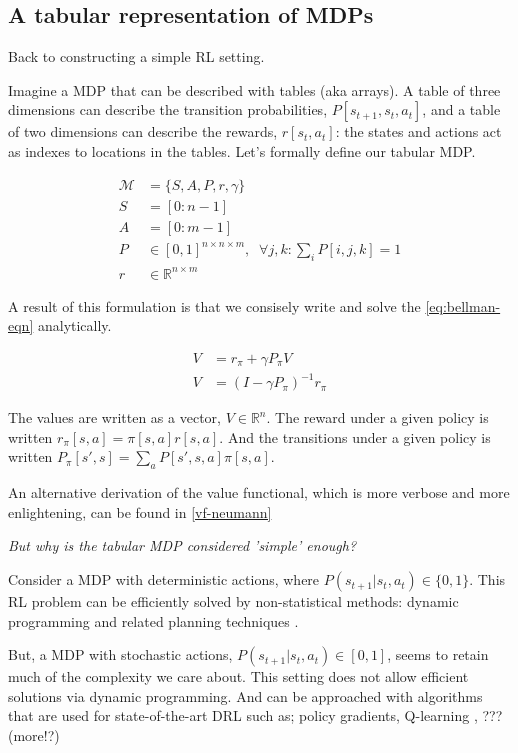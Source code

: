 \subsection{A tabular representation of MDPs}

Back to constructing a simple RL setting.

Imagine a MDP that can be described with tables (aka arrays). A table of
three dimensions can describe the transition probabilities, $P[s_{t+1}, s_t, a_t]$,
and a table of two dimensions can describe the rewards, $r[s_t, a_t]$: the
states and actions act as indexes to locations in the tables.
Let's formally define our tabular MDP.

\begin{align}
\mathcal M &= \{S, A, P, r, \gamma\}\; \tag{the MDP}\\
S &= [0:n-1] \tag{the state space}\\
A &= [0:m-1] \tag{the action space}\\
P &\in [0,1]^{n\times n \times m}, \;\;\forall j, k : \sum_i P[i, j, k] = 1 \tag{the transition fn}\\
r &\in \mathbb R^{n\times m} \tag{the reward fn}
\end{align}

A result of this formulation is that we consisely write and solve the \eqref{eq:bellman-eqn} analytically. \footnotemark[1]


\begin{align}
V &= r_{\pi} + \gamma P_{\pi} V \tag{tabular Bellman eqn}\\
V &= (I-\gamma P_{\pi})^{-1}r_{\pi}  \label{eq:value-functional}\tag{Value functional}
\end{align}

The values are written as a vector, $V \in \mathbb R^n$.
The reward under a given policy is written $r_{\pi}[s, a] = \pi[s, a] r[s, a]$.
And the transitions under a given policy is written $P_{\pi}[s', s] = \sum_a P[s', s, a]\pi[s, a]$.

An alternative derivation of the value functional, which is more verbose and more enlightening, can be found in \ref{vf-neumann}

\begin{displayquote}
\textit{But why is the tabular MDP considered 'simple' enough?}
\end{displayquote}

Consider a MDP with deterministic actions, where $P(s_{t+1}|s_t, a_t) \in \{ 0, 1\}$.
This RL problem can be efficiently solved by non-statistical
methods: dynamic programming and related planning techniques \cite{Bertsekas1995}.

But, a MDP with stochastic actions, $P(s_{t+1}|s_t, a_t) \in [0, 1]$,
seems to retain much of the complexity we care about. This setting does not allow
efficient solutions via dynamic programming. And can be approached with algorithms
that are used for state-of-the-art DRL such as;
policy gradients\cite{Schulman2015a}, Q-learning \cite{Mnih2015}, ??? (more!?)
